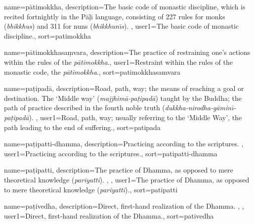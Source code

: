 {
name={p\=atimokkha},
description={The basic code of monastic discipline, which is recited fortnightly in the P\=a\d{l}i language, consisting of 227 rules for monks (\textit{bhikkhus}) and 311 for nuns (\textit{bhikkhun\={\i}s}). \protect \seepre %
\protect {}%
\protect \seepost %
},
user1={The basic code of monastic discipline.},
sort={patimokkha}
}

{
name=p\=atimokkhasa\d{m}vara,
description={The practice of restraining one's actions within the rules of the \textit{p\=atimokkha}.},
user1={Restraint within the rules of the monastic code, the \textit{p\=atimokkha}.},
sort={patimokkhasamvara}
}

{
name={pa\d{t}ipad\=a},
description={Road, path, way; the means of reaching a goal or destination. The `Middle way' (\textit{majjhim\=a-pa\d{t}ipad\=a}) taught by the Buddha; the path of practice described in the fourth noble truth (\textit{dukkha-nirodha-g\=amin\={\i}-pa\d{t}ipad\=a}). \protect \seepre %
\protect {}%
\protect \seepost %
},
user1={Road, path, way; usually referring to the `Middle Way', the path leading to the end of suffering.},
sort={patipada}
}

{
name=pa\d{t}ipatti-dhamma,
description={Practicing according to the scriptures. \protect \seepre %
\protect {}%
\protect \seepost %
},
user1={Practicing according to the scriptures.},
sort={patipatti-dhamma}
}

{
name={pa\d{t}ipatti},
description={The practice of Dhamma, as opposed to mere theoretical knowledge (\textit{pariyatti}). \protect \seepre %
\protect {}, \protect {}%
\protect \seepost %
},
user1={The practice of Dhamma, as opposed to mere theoretical knowledge (\textit{pariyatti}).},
sort={patipatti}
}

{
name={pa\d{t}ivedha},
description={Direct, first-hand realization of the Dhamma. \protect \seepre %
\protect {}, \protect {}%
\protect \seepost %
},
user1={Direct, first-hand realization of the Dhamma.},
sort={pativedha}
}

